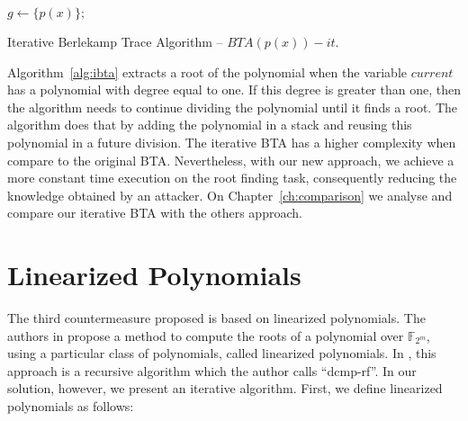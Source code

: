 \begin{algorithm}[ht]
    $g \gets \{p(x)\};$ 
 \caption{Iterative Berlekamp Trace Algorithm -- $BTA(p(x))-it$.}
  \label{alg:ibta}
\end{algorithm}

Algorithm~\ref{alg:ibta} extracts a root of the polynomial when the variable $current$ has a polynomial with degree equal to one. If this degree is greater than one, then the algorithm needs to continue dividing the polynomial until it finds a root. The algorithm does that by adding the polynomial in a stack and reusing this polynomial in a future division. The iterative BTA has a higher complexity when compare to the original BTA. Nevertheless, with our new approach, we achieve a more constant time execution on the root finding task, consequently reducing the knowledge obtained by an attacker. On Chapter~\ref{ch:comparison} we analyse and compare our iterative BTA with the others approach.

\section{Linearized Polynomials}
The third countermeasure proposed is based on linearized polynomials. The authors in \cite{fedorenko2002finding} propose a method to compute the roots of a polynomial over $\mathbb{F}_{2^m}$, using a particular class of polynomials, called linearized polynomials. In \cite{strenzke2012fast}, this approach is a recursive algorithm which the author calls ``dcmp-rf''. In our solution, however, we present an iterative algorithm. First, we define linearized polynomials as follows:

